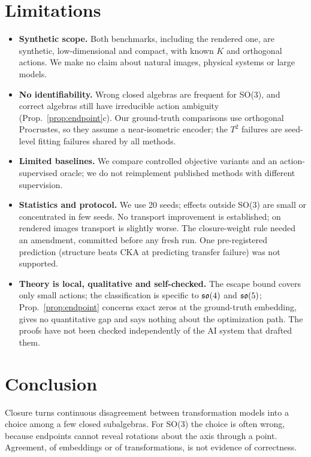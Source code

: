 \section{Limitations}\label{sec:limits}
\begin{itemize}
\item \textbf{Synthetic scope.} Both benchmarks, including the rendered one, are synthetic, low-dimensional and
compact, with known $K$ and orthogonal actions. We make no claim about natural images, physical systems or large models.
\item \textbf{No identifiability.} Wrong closed algebras are frequent for SO(3), and correct algebras still have
irreducible action ambiguity (Prop.~\ref{prop:endpoint}c). Our ground-truth comparisons use orthogonal Procrustes, so
they assume a near-isometric encoder; the $T^2$ failures are seed-level fitting failures shared by all methods.
\item \textbf{Limited baselines.} We compare controlled objective variants and an action-supervised oracle; we do not
reimplement published methods with different supervision.
\item \textbf{Statistics and protocol.} We use 20 seeds; effects outside SO(3) are small or concentrated in few
seeds. No transport improvement is established; on rendered images transport is slightly worse. The closure-weight rule needed an amendment, committed before any fresh
run. One pre-registered prediction (structure beats CKA at predicting transfer failure) was not supported.
\item \textbf{Theory is local, qualitative and self-checked.} The escape bound covers only small actions; the
classification is specific to $\mathfrak{so}(4)$ and $\mathfrak{so}(5)$; Prop.~\ref{prop:endpoint} concerns exact zeros at the
ground-truth embedding, gives no quantitative gap and says nothing about the optimization path. The proofs have not
been checked independently of the AI system that drafted them.
\end{itemize}

\section{Conclusion}\label{sec:conclusion}
Closure turns continuous disagreement between transformation models into a choice among a few closed subalgebras.
For SO(3) the choice is often wrong, because endpoints cannot reveal rotations about the axis through a point.
Agreement, of embeddings or of transformations, is not evidence of correctness.
